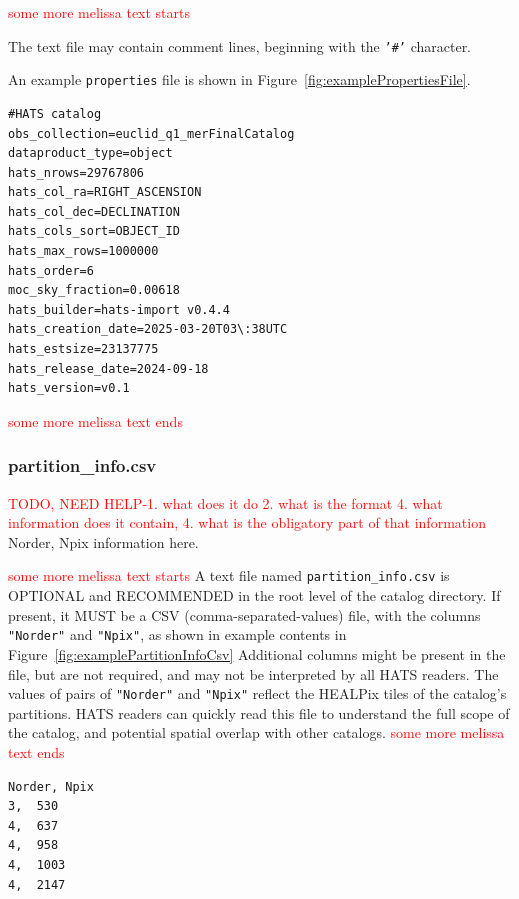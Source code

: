 \documentclass[11pt,a4paper]{ivoa}
\begin{document}
\textcolor{red}{some more melissa text starts}

The text file may contain comment lines, beginning with the \texttt{'\#'} character.

An example \texttt{properties} file is shown in Figure~\ref{fig:examplePropertiesFile}.

\begin{minipage}{\linewidth}
\begin{lstlisting}[caption=Example \texttt{properties} file contents, label=fig:examplePropertiesFile]
#HATS catalog
obs_collection=euclid_q1_merFinalCatalog
dataproduct_type=object
hats_nrows=29767806
hats_col_ra=RIGHT_ASCENSION
hats_col_dec=DECLINATION
hats_cols_sort=OBJECT_ID
hats_max_rows=1000000
hats_order=6
moc_sky_fraction=0.00618
hats_builder=hats-import v0.4.4
hats_creation_date=2025-03-20T03\:38UTC
hats_estsize=23137775
hats_release_date=2024-09-18
hats_version=v0.1
\end{lstlisting}
\end{minipage}

\textcolor{red}{some more melissa text ends}


\subsubsection{partition\_info.csv} 
   \textcolor{red}{TODO, NEED HELP-1. what does it do 2. what is the format 4. what information does it contain, 4. what is the obligatory part of that information}
	Norder, Npix  information here. 

    \textcolor{red}{some more melissa text starts}
A text file named \texttt{partition\_info.csv} is OPTIONAL and RECOMMENDED in the root level of the catalog directory.
If present, it MUST be a CSV (comma-separated-values) file, with the columns \texttt{"Norder"} and \texttt{"Npix"}, as shown in example contents in Figure~\ref{fig:examplePartitionInfoCsv}
Additional columns might be present in the file, but are not required, and may not be interpreted by all HATS readers.
The values of pairs of \texttt{"Norder"} and \texttt{"Npix"} reflect the HEALPix tiles of the catalog's partitions. 
HATS readers can quickly read this file to understand the full scope of the catalog, and potential spatial overlap with other catalogs.
\textcolor{red}{some more melissa text ends}

\begin{minipage}{\linewidth}
\begin{lstlisting}[caption=Example \texttt{partition\_info.csv} file contents, label=fig:examplePartitionInfoCsv]    
Norder,	Npix
3,	530
4,	637
4,	958
4,	1003
4,	2147
\end{lstlisting}
\end{minipage}
\end{document}

